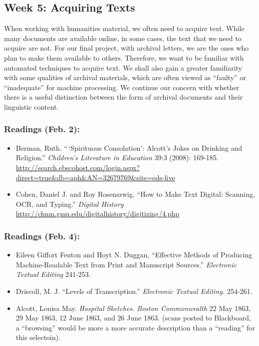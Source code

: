 \documentclass[]{article}
\begin{document}
\subsection{Week 5: Acquiring Texts}\label{week-5-acquiring-texts}

When working with humanities material, we often need to acquire text.
While many documents are available online, in some cases, the text that
we need to acquire are not. For our final project, with archival
letters, we are the ones who plan to make them available to others.
Therefore, we want to be familiar with automated techniques to acquire
text. We shall also gain a greater familiarity with some qualities of
archival materials, which are often viewed as ``faulty'' or
``inadequate'' for machine processing. We continue our concern with
whether there is a useful distinction between the form of archival
documents and their linguistic content.

\subsubsection{Readings (Feb. 2):}\label{readings-feb.-2}

\begin{itemize}
\itemsep1pt\parskip0pt
\item
  Berman, Ruth. ``\,`Spirituous Consolation': Alcott's Jokes on Drinking
  and Religion.'' \emph{Children's Literature in Education} 39:3 (2008):
  169-185.
  \url{http://search.ebscohost.com/login.aspx?direct=true\&db=aph\&AN=32679769\&site=eds-live}
\item
  Cohen, Daniel J. and Roy Rosenszwig, ``How to Make Text Digital:
  Scanning, OCR, and Typing.'' \emph{Digital History}
  \url{http://chnm.gmu.edu/digitalhistory/digitizing/4.php}
\end{itemize}

\subsubsection{Readings (Feb. 4):}\label{readings-feb.-4}

\begin{itemize}
\itemsep1pt\parskip0pt
\item
  Eileen Giffort Fenton and Hoyt N. Duggan, ``Effective Methods of
  Producing Machine-Readable Text from Print and Manuscript Sources.''
  \emph{Electronic Textual Editing} 241-253.
\item
  Driscoll, M. J. ``Levels of Transcription.'' \emph{Electronic Textual
  Editing.} 254-261.
\item
  Alcott, Louisa May. \emph{Hospital Sketches. Boston Commonwealth} 22
  May 1863, 29 May 1863, 12 June 1863, and 26 June 1863. (scans posted
  to Blackboard, a ``browsing'' would be more a more accurate
  description than a ``reading'' for this selectoin).
\end{itemize}
\end{document}
